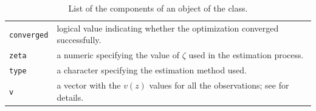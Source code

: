 \begin{table}[t!]
\begin{tabular}{lp{10.4cm}}
\texttt{converged}        & {logical value indicating whether the optimization converged successfully.}   \\
\texttt{zeta}             & {a numeric specifying the value of $\zeta$ used in the estimation process. }   \\
\texttt{type}             & {a character specifying the estimation method used.}   \\
\texttt{v}                & {a vector with the $v(z)$ values for all the observations; see \cite{QueirozFerrari2023} for details.}   \\
 \hline
\end{tabular}
\caption{\label{tab:components} List of the components of an object of the  class.}
\end{table}



